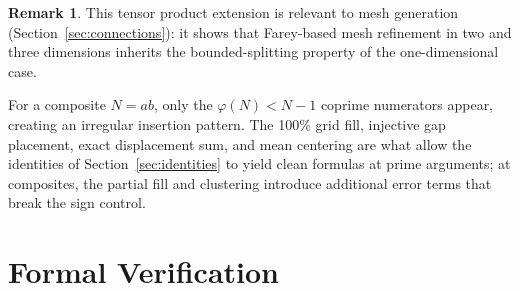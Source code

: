 \documentclass[11pt]{article}
\theoremstyle{definition}
\newtheorem{remark}[theorem]{Remark}
\begin{document}
\begin{remark}
This tensor product extension is relevant to mesh generation
(Section~\ref{sec:connections}): it shows that Farey-based
mesh refinement in two and three dimensions inherits the
bounded-splitting property of the one-dimensional case.
\end{remark}

For a composite $N = ab$, only the $\varphi(N) < N - 1$ coprime
numerators appear, creating an irregular insertion pattern.
The 100\% grid fill, injective gap placement, exact displacement
sum, and mean centering are what allow the identities of
Section~\ref{sec:identities} to yield clean formulas at prime
arguments; at composites, the partial fill and clustering introduce
additional error terms that break the sign control.


\section{Formal Verification}\label{sec:formal}
\end{document}
